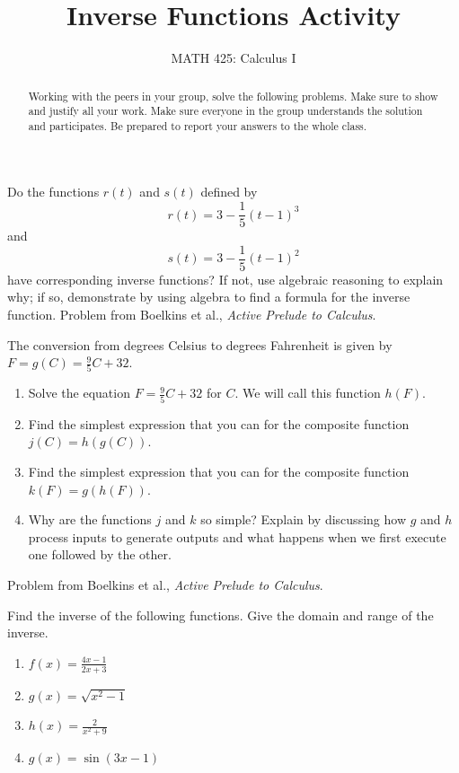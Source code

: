 \documentclass{ximera}
\title{Inverse Functions Activity}
\author{MATH 425: Calculus I}
\begin{document}
\begin{abstract}
    Working with the peers in your group, solve the following problems. Make sure to show and justify all your work. Make sure everyone in the group understands the solution and participates. Be prepared to report your answers to the whole class. 
\end{abstract}
\maketitle

\begin{exercise}
     Do the functions $r(t)$ and $s(t)$ defined by
        \[r(t)=3-\frac15(t-1)^3\]
    and 
        \[s(t)=3-\frac15(t-1)^2\]
    have corresponding inverse functions? If not, use algebraic reasoning to explain why; if so, demonstrate by using algebra to find a formula for the inverse function.
    Problem from Boelkins et al., \textit{Active Prelude to Calculus}.
\end{exercise}

\begin{exercise}
    The conversion from degrees Celsius to degrees Fahrenheit is given by $F=g(C)=\frac95 C+32$.
    \begin{enumerate}
        \item Solve the equation $F=\frac95C+32$ for $C$.  We will call this function $h(F)$.
        \item Find the simplest expression that you can for the composite function $j(C)=h(g(C))$.
        \item Find the simplest expression that you can for the composite function $k(F)=g(h(F))$.
        \item Why are the functions $j$ and $k$ so simple?  Explain by discussing how $g$ and $h$ process inputs to generate outputs and what happens when we first execute one followed by the other.
    \end{enumerate}
    Problem from Boelkins et al., \textit{Active Prelude to Calculus}.
\end{exercise}


\begin{exercise}
    Find the inverse of the following functions.  Give the domain and range of the inverse. 
    \begin{enumerate}
    \item $f(x)=\frac{4x-1}{2x+3}$
    \item $g(x)=\sqrt{x^2-1}$
    \item $h(x)=\frac{2}{x^2+9}$
    \item $g(x)=\sin(3x-1)$
    \end{enumerate}
\end{exercise}
\end{document}
